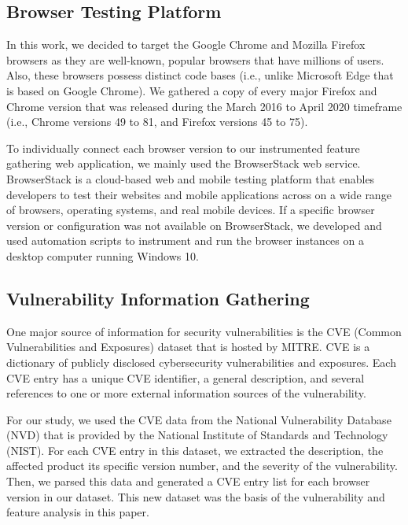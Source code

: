 \subsection{Browser Testing Platform}

In this work, we decided to target the Google Chrome and Mozilla
Firefox browsers as they are well-known, popular browsers that have
millions of users. Also, these browsers possess distinct code bases
(i.e., unlike Microsoft Edge that is based on Google Chrome). We
gathered a copy of every major Firefox and Chrome version that was
released during the March 2016 to April 2020 timeframe (i.e., Chrome
versions 49 to 81, and Firefox versions 45 to 75).

To individually connect each browser version to our instrumented
feature gathering web application, we mainly used the BrowserStack web
service. BrowserStack is a cloud-based web and mobile testing platform
that enables developers to test their websites and mobile applications
across on a wide range of browsers, operating systems, and real mobile
devices. If a specific browser version or configuration was not
available on BrowserStack, we developed and used automation scripts to
instrument and run the browser instances on a desktop computer running
Windows 10.

\subsection{Vulnerability Information Gathering}

One major source of information for security vulnerabilities is the
CVE (Common Vulnerabilities and Exposures) dataset that is hosted by
MITRE. CVE is a dictionary of publicly disclosed cybersecurity
vulnerabilities and exposures. Each CVE entry has a unique CVE
identifier, a general description, and several references to one or
more external information sources of the vulnerability.

For our study, we used the CVE data from the National Vulnerability
Database (NVD) that is provided by the National Institute of Standards
and Technology (NIST). For each CVE entry in this dataset, we
extracted the description, the affected product its specific version
number, and the severity of the vulnerability. Then, we parsed this
data and generated a CVE entry list for each browser version in our
dataset. This new dataset was the basis of the vulnerability and
feature analysis in this paper.


